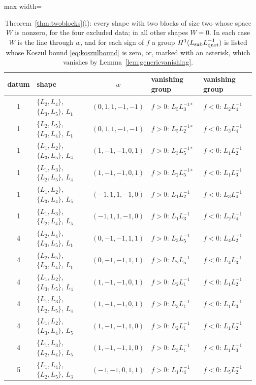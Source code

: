 \begin{table}[t]\small\centering
\caption{Theorem~\ref{thm:twoblocks}(i): every shape with two blocks of
size two whose space $W$ is nonzero, for the four excluded data; in all
other shapes $W=0$. In each case $W$ is the line through $w$, and for each
sign of $f$ a group $H^1(L_{\rm sub}L_{\rm quot}^{-1})$ is listed whose
Koszul bound \eqref{eq:koszulbound} is zero, or, marked with an asterisk,
which vanishes by Lemma~\ref{lem:genericvanishing}.}\label{tab:excluded}
\begin{adjustbox}{max width=\linewidth}
\begin{tabular}{@{}clcll@{}}
\toprule
datum & shape & $w$ & vanishing group & vanishing group\\\midrule
1 & $\{L_2,L_4\}$, $\{L_3,L_5\}$, $L_1$ & $(0,1,1,-1,-1)$ & $f>0$: $L_5L_3^{-1}{}^{*}$ & $f<0$: $L_2L_4^{-1}$\\
1 & $\{L_2,L_5\}$, $\{L_3,L_4\}$, $L_1$ & $(0,1,1,-1,-1)$ & $f>0$: $L_5L_2^{-1}{}^{*}$ & $f<0$: $L_3L_4^{-1}$\\
1 & $\{L_1,L_2\}$, $\{L_3,L_5\}$, $L_4$ & $(1,-1,-1,0,1)$ & $f>0$: $L_3L_5^{-1}{}^{*}$ & $f<0$: $L_1L_2^{-1}$\\
1 & $\{L_1,L_3\}$, $\{L_2,L_5\}$, $L_4$ & $(1,-1,-1,0,1)$ & $f>0$: $L_2L_5^{-1}{}^{*}$ & $f<0$: $L_1L_3^{-1}$\\
1 & $\{L_1,L_2\}$, $\{L_3,L_4\}$, $L_5$ & $(-1,1,1,-1,0)$ & $f>0$: $L_1L_2^{-1}$ & $f<0$: $L_3L_4^{-1}$\\
1 & $\{L_1,L_3\}$, $\{L_2,L_4\}$, $L_5$ & $(-1,1,1,-1,0)$ & $f>0$: $L_1L_3^{-1}$ & $f<0$: $L_2L_4^{-1}$\\
4 & $\{L_2,L_4\}$, $\{L_3,L_5\}$, $L_1$ & $(0,-1,-1,1,1)$ & $f>0$: $L_3L_5^{-1}$ & $f<0$: $L_4L_2^{-1}$\\
4 & $\{L_2,L_5\}$, $\{L_3,L_4\}$, $L_1$ & $(0,-1,-1,1,1)$ & $f>0$: $L_2L_5^{-1}$ & $f<0$: $L_4L_3^{-1}$\\
4 & $\{L_1,L_2\}$, $\{L_3,L_5\}$, $L_4$ & $(1,-1,-1,0,1)$ & $f>0$: $L_2L_1^{-1}$ & $f<0$: $L_1L_2^{-1}$\\
4 & $\{L_1,L_3\}$, $\{L_2,L_5\}$, $L_4$ & $(1,-1,-1,0,1)$ & $f>0$: $L_3L_1^{-1}$ & $f<0$: $L_1L_3^{-1}$\\
4 & $\{L_1,L_2\}$, $\{L_3,L_4\}$, $L_5$ & $(1,-1,-1,1,0)$ & $f>0$: $L_2L_1^{-1}$ & $f<0$: $L_1L_2^{-1}$\\
4 & $\{L_1,L_3\}$, $\{L_2,L_4\}$, $L_5$ & $(1,-1,-1,1,0)$ & $f>0$: $L_3L_1^{-1}$ & $f<0$: $L_1L_3^{-1}$\\
5 & $\{L_1,L_4\}$, $\{L_2,L_5\}$, $L_3$ & $(-1,-1,0,1,1)$ & $f>0$: $L_1L_4^{-1}$ & $f<0$: $L_5L_2^{-1}$\\

\end{tabular}
\end{adjustbox}
\end{table}
